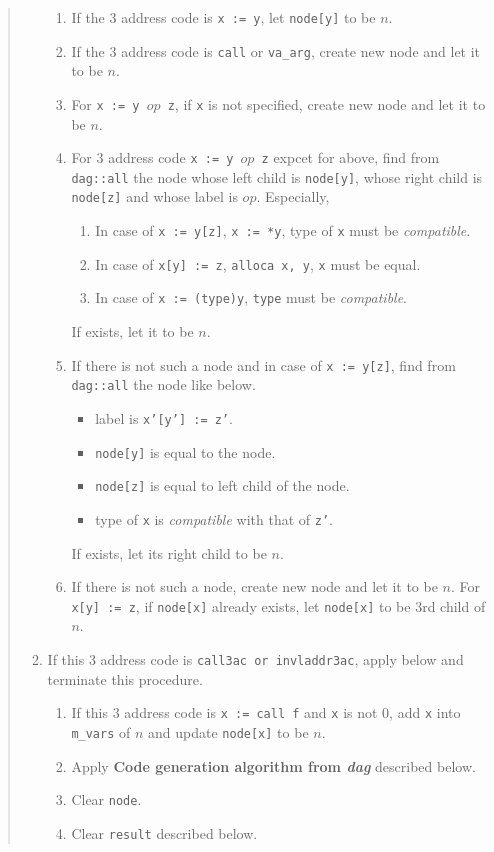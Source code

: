 \begin{quote}
\begin{enumerate}
\begin{enumerate}
\item If the 3 address code is {\tt{x := y}},
      let {\tt{node[y]}} to be $n$.
\item If the 3 address code is {\tt{call}} or {\tt{va\_arg}},
      create new node and let it to be $n$.
\item For {\tt{x := y $op$ z}}, if {\tt{x}} is not specified,
      create new node and let it to be $n$.
\item For 3 address code {\tt{x := y $op$ z}} expcet for above,
      find from {\tt{dag::all}} the node 
      whose left child is {\tt{node[y]}},
      whose right child is {\tt{node[z]}}
      and
      whose label is $op$. Especially,
\begin{enumerate}
\item In case of {\tt{x := y[z]}}, {\tt{x := *y}},
      type of {\tt{x}} must be {\it
      compatible}.
\item In case of {\tt{x[y] := z}}, {\tt{alloca x, y}},
      {\tt{x}} must be equal.
\item In case of {\tt{x := (type)y}}, {\tt{type}} must be
     {\it compatible}.
\end{enumerate}
      If exists, let it to be $n$.
\item \label{optimize_e109}
      If there is not such a node and in case of {\tt{x := y[z]}},
      find from {\tt{dag::all}} the node like below.
      \begin{itemize}
      \item label is {\tt{x'[y'] := z'}}.
      \item {\tt{node[y]}} is equal to the node.
      \item {\tt{node[z]}} is equal to left child of the node.
      \item type of {\tt{x}} is {\it compatible} with that of {\tt{z'}}.
      \end{itemize}
      If exists, let its right child to be $n$.
\item \label{optimize_e064}
If there is not such a node, create new node and let it to be $n$.
For {\tt{x[y] := z}}, if {\tt{node[x]}} already exists, let {\tt{node[x]}}
to be 3rd child of $n$.
\end{enumerate}
\item \label{optimize_e112}
      If this 3 address code is {\tt{call3ac} or {\tt{invladdr3ac}}},
      apply below and terminate this procedure.
      \begin{enumerate}
      \item If this 3 address code is {\tt{x := call f}} and {\tt{x}} 
            is not 0, add {\tt{x}} into {\tt{m\_vars}} of $n$ and
            update {\tt{node[x]}} to be $n$. 
      \item Apply {\bf Code generation algorithm from {\em dag}}
	    described below.
      \item Clear {\tt{node}}.
      \item Clear {\tt{result}} described below.
      \end{enumerate}


\end{enumerate}
\end{quote}
